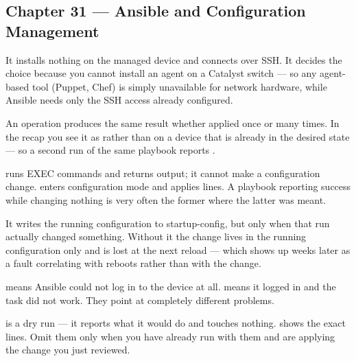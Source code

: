 \subsection*{Chapter 31 --- Ansible and Configuration Management}
\begin{tightnum}
  \item It installs nothing on the managed device and connects over SSH. It
        decides the choice because you cannot install an agent on a Catalyst
        switch --- so any agent-based tool (Puppet, Chef) is simply unavailable
        for network hardware, while Ansible needs only the SSH access already
        configured.
  \item An operation produces the same result whether applied once or many times.
        In the recap you see it as  rather than  on a device
        that is already in the desired state --- so a second run of the same
        playbook reports .
  \item {} runs EXEC commands and returns output; it cannot make a
        configuration change.  enters configuration mode and
        applies lines. A playbook reporting success while changing nothing is very
        often the former where the latter was meant.
  \item It writes the running configuration to startup-config, but only when that
        run actually changed something. Without it the change lives in the running
        configuration only and is lost at the next reload --- which shows up weeks
        later as a fault correlating with reboots rather than with the change.
  \item {} means Ansible could not log in to the device at all.
         means it logged in and the task did not work. They point at
        completely different problems.
  \item {} is a dry run --- it reports what it would do and touches
        nothing.  shows the exact lines. Omit them only when you have
        already run with them and are applying the change you just reviewed.
\end{tightnum}

